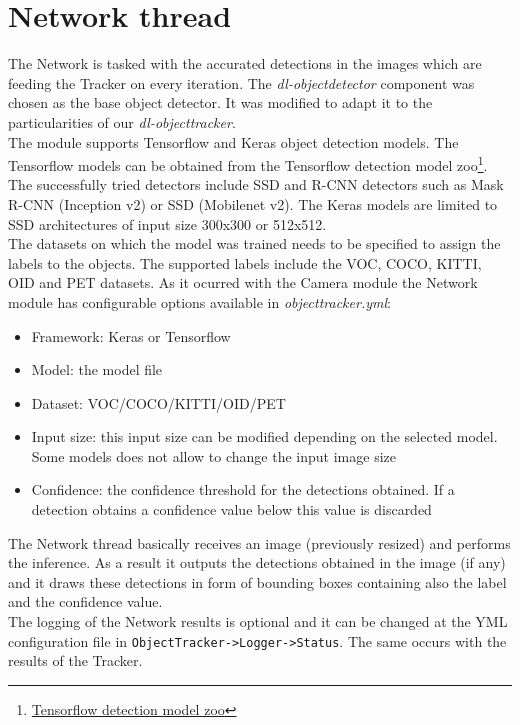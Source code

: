 \section{Network thread} 
The Network is tasked with the accurated detections in the images which are feeding the Tracker on every iteration. The \textit{dl-objectdetector} component was chosen as the base object detector. It was modified to adapt it to the particularities of our \textit{dl-objecttracker}.\\
The module supports Tensorflow and Keras object detection models. The Tensorflow models can be obtained from the Tensorflow detection model zoo\footnote{\href {https://github.com/tensorflow/models/blob/master/research/object_detection/g3doc/detection_model_zoo.md}{Tensorflow detection model zoo}}. The successfully tried detectors include SSD and R-CNN detectors such as Mask R-CNN (Inception v2) or SSD (Mobilenet v2). The Keras models are limited to SSD architectures of input size 300x300 or 512x512.\\
The datasets on which the model was trained needs to be specified to assign the labels to the objects. The supported labels include the VOC, COCO, KITTI, OID and PET datasets. As it ocurred with the Camera module the Network module has configurable options available in \textit{objecttracker.yml}:
\begin{itemize}
    \item Framework: Keras or Tensorflow
    \item Model: the model file
    \item Dataset: VOC/COCO/KITTI/OID/PET
    \item Input size: this input size can be modified depending on the selected model. Some models does not allow to change the input image size
    \item Confidence: the confidence threshold for the detections obtained. If a detection obtains a confidence value below this value is discarded
\end{itemize}
The Network thread basically receives an image (previously resized) and performs the inference. As a result it outputs the detections obtained in the image (if any) and it draws these detections in form of bounding boxes containing also the label and the confidence value.\\
The logging of the Network results is optional and it can be changed at the YML configuration file in \texttt{ObjectTracker->Logger->Status}. The same occurs with the results of the Tracker.
